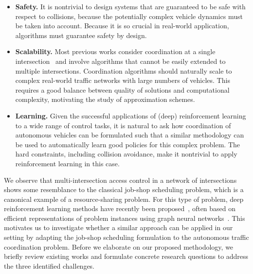 \documentclass{article}
\theoremstyle{definition}
\theoremstyle{plain}
\begin{document}
\begin{itemize}

  \item \textbf{Safety.} It is nontrivial to design systems that are guaranteed
        to be safe with respect to collisions, because the potentially complex
        vehicle dynamics must be taken into account. Because it is so
        crucial in real-world application, algorithms must guarantee safety by
        design.

  \item \textbf{Scalability.} Most previous works consider coordination at a single
        intersection~\cite{khayatianSurveyIntersectionManagement2020} and involve algorithms that cannot be easily extended
        to multiple intersections. Coordination algorithms should naturally
        scale to complex real-world traffic networks with large numbers of
        vehicles. This requires a good balance between quality of solutions and
        computational complexity, motivating the study of approximation
        schemes.

  \item \textbf{Learning.} Given the successful applications of (deep) reinforcement learning
        to a wide range of control tasks, it is natural to ask how
        coordination of autonomous vehicles can be formulated such that a
        similar methodology can be used to automatically learn good policies for
        this complex problem.
        The hard constraints, including collision avoidance, make it nontrivial to
        apply reinforcement learning in this case.
\end{itemize}

We observe that multi-intersection access control in a network of intersections
shows some resemblance to the classical job-shop scheduling problem, which is a
canonical example of a resource-sharing problem. For this type of problem, deep
reinforcement learning methods have recently been proposed~\cite{zhangLearningDispatchJob2020,zhangDeepReinforcementLearning2024}, often based on
efficient representations of problem instances using graph neural
networks~\cite{smitGraphNeuralNetworks2024}. This motivates us to investigate
whether a similar approach can be applied in our setting by adapting the
job-shop scheduling formulation to the autonomous traffic coordination problem.
Before we elaborate on our proposed methodology, we briefly review existing works
and formulate concrete research questions to address the three identified
challenges.
\end{document}
